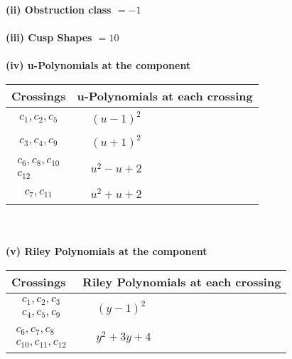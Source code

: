 \documentclass[1p]{elsarticle_modified}
\theoremstyle{definition}
\begin{document}
\flushleft \textbf{(ii) Obstruction class $= -1$}\\~\\
\flushleft \textbf{(iii) Cusp Shapes $= 10$}\\~\\
\newpage\renewcommand{\arraystretch}{1}
\flushleft \textbf{(iv) u-Polynomials at the component}\newline \\
\begin{tabular}{m{50pt}|m{274pt}}
Crossings & \hspace{64pt}u-Polynomials at each crossing \\
\hline $$\begin{aligned}c_{1},c_{2},c_{5}\end{aligned}$$&$\begin{aligned}
&(u-1)^2
\end{aligned}$\\
\hline $$\begin{aligned}c_{3},c_{4},c_{9}\end{aligned}$$&$\begin{aligned}
&(u+1)^2
\end{aligned}$\\
\hline $$\begin{aligned}c_{6},c_{8},c_{10}\\c_{12}\end{aligned}$$&$\begin{aligned}
&u^2- u+2
\end{aligned}$\\
\hline $$\begin{aligned}c_{7},c_{11}\end{aligned}$$&$\begin{aligned}
&u^2+u+2
\end{aligned}$\\
\hline
\end{tabular}\\~\\
\newpage\renewcommand{\arraystretch}{1}
\flushleft \textbf{(v) Riley Polynomials at the component}\newline \\
\begin{tabular}{m{50pt}|m{274pt}}
Crossings & \hspace{64pt}Riley Polynomials at each crossing \\
\hline $$\begin{aligned}c_{1},c_{2},c_{3}\\c_{4},c_{5},c_{9}\end{aligned}$$&$\begin{aligned}
&(y-1)^2
\end{aligned}$\\
\hline $$\begin{aligned}c_{6},c_{7},c_{8}\\c_{10},c_{11},c_{12}\end{aligned}$$&$\begin{aligned}
&y^2+3 y+4
\end{aligned}$\\
\hline
\end{tabular}\\~\\
\end{document}
